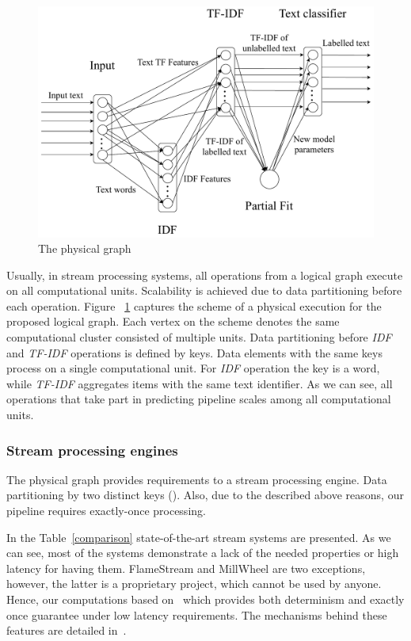 \begin{figure}[htbp]
  \centering
  \includegraphics[scale=0.375]{pics/physical-graph}
  \caption{The physical graph}
  \label {physical_graph}
\end{figure}

Usually, in stream processing systems, all operations from a logical graph execute on all computational units. Scalability is achieved due to data partitioning before each operation. Figure ~\ref{physical_graph} captures the scheme of a physical execution for the proposed logical graph. Each vertex on the scheme denotes the same computational cluster consisted of multiple units. Data partitioning before {\em IDF} and {\em TF-IDF} operations is defined by keys. Data elements with the same keys process on a single computational unit. For {\em IDF} operation the key is a word, while {\em TF-IDF} aggregates items with the same text identifier. As we can see, all operations that take part in predicting pipeline scales among all computational units. 

\subsubsection{Stream processing engines}

The physical graph provides requirements to a stream processing engine. Data partitioning by two distinct keys (). Also, due to the described above reasons, our pipeline requires exactly-once processing. 

In the Table~\ref{comparison} state-of-the-art stream systems are presented. As we can see, most of the systems demonstrate a lack of the needed properties or high latency for having them. FlameStream and MillWheel are two exceptions, however, the latter is a proprietary project, which cannot be used by anyone. Hence, our computations based on \FlameStream\, which provides both determinism and exactly once guarantee under low latency requirements. The mechanisms behind these features are detailed in~\cite{we2018adbis, we2018beyondmr}.


